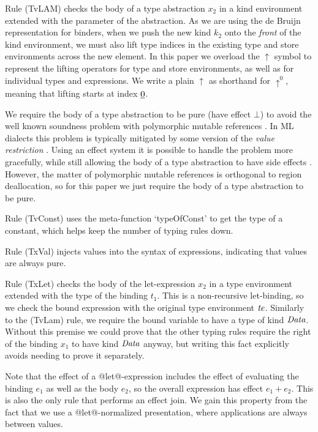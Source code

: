 Rule (TvLAM) checks the body of a type abstraction $x_2$ in a kind environment extended with the parameter of the abstraction. As we are using the de Bruijn representation for binders, when we push the new kind $k_2$ onto the \emph{front} of the kind environment, we must also lift type indices in the existing type and store environments across the new element. In this paper we overload the $\uparrow$ symbol to represent the lifting operators for type and store environments, as well as for individual types and expressions. We write a plain $\uparrow$ as shorthand for $\uparrow^0$, meaning that lifting starts at index $\underline{0}$.

We require the body of a type abstraction to be pure (have effect $\bot$) to avoid the well known soundness problem with polymorphic mutable references \cite{Leroy:polymorphism-by-name}. In ML dialects this problem is typically mitigated by some version of the \emph{value restriction} \cite{Garrigue:relaxing}. Using an effect system it is possible to handle the problem more gracefully, while still allowing the body of a type abstraction to have side effects \cite{Talpin:discipline}. However, the matter of polymorphic mutable references is orthogonal to region deallocation, so for this paper we just require the body of a type abstraction to be pure. 

Rule (TvConst) uses the meta-function `typeOfConst' to get the type of a constant, which helps keep the number of typing rules down.

Rule (TxVal) injects values into the syntax of expressions, indicating that values are always pure.

Rule (TxLet) checks the body of the let-expression $x_2$ in a type environment extended with the type of the binding $t_1$. This is a non-recursive let-binding, so we check the bound expression with the original type environment $\mathit{te}$. Similarly to the (TvLam) rule, we require the bound variable to have a type of kind $\mathit{Data}$. Without this premise we could prove that the other typing rules require the right of the binding $x_1$ to have kind $\mathit{Data}$ anyway, but writing this fact explicitly avoids needing to prove it separately.

Note that the effect of a @let@-expression includes the effect of evaluating the binding $e_1$ as well as the body $e_2$, so the overall expression has effect $e_1 + e_2$. This is also the only rule that performs an effect join. We gain this property from the fact that we use a @let@-normalized presentation, where applications are always between values.

